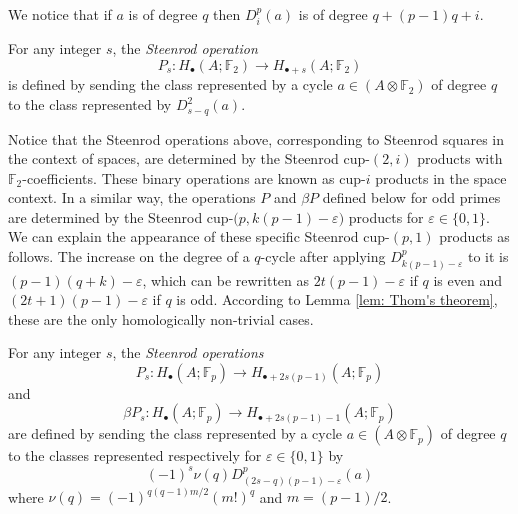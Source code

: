 We notice that if $a$ is of degree $q$ then $D^p_i(a)$ is of degree $q + (p-1)q + i$.

\begin{definition}
	For any integer $s$, the \textit{Steenrod operation}
	\begin{equation*}
	P_s \colon H_\bullet(A; \mathbb{F}_2) \to H_{\bullet + s}(A; \mathbb{F}_2)
	\end{equation*}
	is defined by sending the class represented by a cycle $a \in (A \otimes \mathbb{F}_2)$ of degree $q$ to the class represented by $D^2_{s-q}(a)$.
\end{definition}

Notice that the Steenrod operations above, corresponding to Steenrod squares in the context of spaces, are determined by the Steenrod cup-$(2,i)$ products with $\mathbb{F}_2$-coefficients.
These binary operations are known as cup-$i$ products \cite{steenrod1947products, medina2021newformulas} in the space context.
In a similar way, the operations $P$ and $\beta P$ defined below for odd primes are determined by the Steenrod cup-$\big(p, k(p-1)-\varepsilon\big)$ products for $\varepsilon \in \{0,1\}$.
We can explain the appearance of these specific Steenrod cup-$(p,1)$ products as follows.
The increase on the degree of a $q$-cycle after applying $D^p_{k(p-1)-\varepsilon}$ to it is $(p-1)(q+k) - \varepsilon$, which can be rewritten as $2t(p-1) - \varepsilon$ if $q$ is even and $(2t+1)(p-1) - \varepsilon$ if $q$ is odd.
According to Lemma \ref{lem: Thom's theorem}, these are the only homologically non-trivial cases.

\begin{definition} \label{def: Steenrod operations at odd prime}
	For any integer $s$, the \textit{Steenrod operations}
	\begin{equation*}
	P_s \colon H_\bullet(A; \mathbb{F}_p) \to H_{\bullet + 2s(p-1)}(A; \mathbb{F}_p)
	\end{equation*}
	and
	\begin{equation*}
	\beta P_s \colon H_\bullet(A; \mathbb{F}_p) \to H_{\bullet + 2s(p-1) - 1}(A; \mathbb{F}_p)
	\end{equation*}
	are defined by sending the class represented by a cycle $a \in (A \otimes \mathbb{F}_p)$ of degree $q$ to the classes represented respectively for $\varepsilon \in\{0,1\}$ by
	\begin{equation*}
	(-1)^s \nu(q) D^p_{(2s-q)(p-1)-\varepsilon}(a)
	\end{equation*}
	where $\nu(q) = (-1)^{q(q-1)m/2}(m!)^q$ and $m = (p-1)/2$.
\end{definition}

